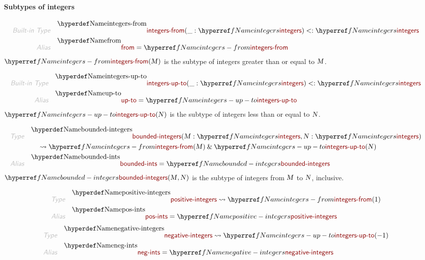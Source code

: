 \paragraph{Subtypes of integers}\hypertarget{subtypes-of-integers}{}\label{subtypes-of-integers}

\begin{align*}
  \KEY{Built-in Type} \quad 
  & \NAMEDECL{integers-from}(
                       \_ : \NAMEREF{integers}) <: \NAMEREF{integers} 
\\
  \KEY{Alias} \quad
  & \NAMEDECL{from} = \NAMEREF{integers-from}
\end{align*}
$\SHADE{\NAMEREF{integers-from}
           (  \VAR{M} )}$ is the subtype of integers greater than or equal to $\SHADE{\VAR{M}}$.

\begin{align*}
  \KEY{Built-in Type} \quad 
  & \NAMEDECL{integers-up-to}(
                       \_ : \NAMEREF{integers}) <: \NAMEREF{integers} 
\\
  \KEY{Alias} \quad
  & \NAMEDECL{up-to} = \NAMEREF{integers-up-to}
\end{align*}
$\SHADE{\NAMEREF{integers-up-to}
           (  \VAR{N} )}$ is the subtype of integers less than or equal to $\SHADE{\VAR{N}}$.

\begin{align*}
  \KEY{Type} \quad 
  & \NAMEDECL{bounded-integers}(
                       \VAR{M} : \NAMEREF{integers}, \VAR{N} : \NAMEREF{integers})  \\&\quad
    \leadsto \NAMEREF{integers-from}
               (  \VAR{M} ) \mathbin{\&} \NAMEREF{integers-up-to}
                                    (  \VAR{N} )
\\
  \KEY{Alias} \quad
  & \NAMEDECL{bounded-ints} = \NAMEREF{bounded-integers}
\end{align*}
$\SHADE{\NAMEREF{bounded-integers}
           (  \VAR{M}, 
                  \VAR{N} )}$ is the subtype of integers from $\SHADE{\VAR{M}}$ to $\SHADE{\VAR{N}}$, inclusive.

\begin{align*}
  \KEY{Type} \quad 
  & \NAMEDECL{positive-integers}  
    \leadsto \NAMEREF{integers-from}
               (  1 )
\\
  \KEY{Alias} \quad
  & \NAMEDECL{pos-ints} = \NAMEREF{positive-integers}
\end{align*}
\begin{align*}
  \KEY{Type} \quad 
  & \NAMEDECL{negative-integers}  
    \leadsto \NAMEREF{integers-up-to}
               (  -1 )
\\
  \KEY{Alias} \quad
  & \NAMEDECL{neg-ints} = \NAMEREF{negative-integers}
\end{align*}
